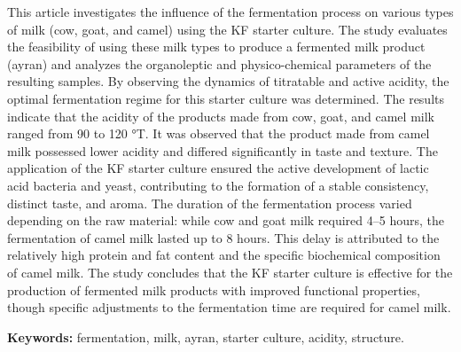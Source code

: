 This article investigates the influence of the fermentation process on
various types of milk (cow, goat, and camel) using the KF starter
culture. The study evaluates the feasibility of using these milk types
to produce a fermented milk product (ayran) and analyzes the
organoleptic and physico-chemical parameters of the resulting samples.
By observing the dynamics of titratable and active acidity, the optimal
fermenta\-tion regime for this starter culture was determined. The results
indicate that the acidity of the products made from cow, goat, and camel
milk ranged from 90 to 120 °T. It was observed that the product made
from camel milk possessed lower acidity and differed significantly in
taste and texture. The application of the KF starter culture ensured the
active development of lactic acid bacteria and yeast, contributing to
the formation of a stable consistency, distinct taste, and aroma. The
duration of the fermentation process varied depending on the raw
material: while cow and goat milk required 4--5 hours, the fermentation
of camel milk lasted up to 8 hours. This delay is attributed to the
relatively high protein and fat content and the specific biochemical
composition of camel milk. The study concludes that the KF starter
culture is effective for the production of fermented milk products with
improved functional properties, though specific adjustments to the
fermentation time are required for camel milk.

{\bfseries Keywords:} fermentation, milk, ayran, starter culture, acidity,
structure.

